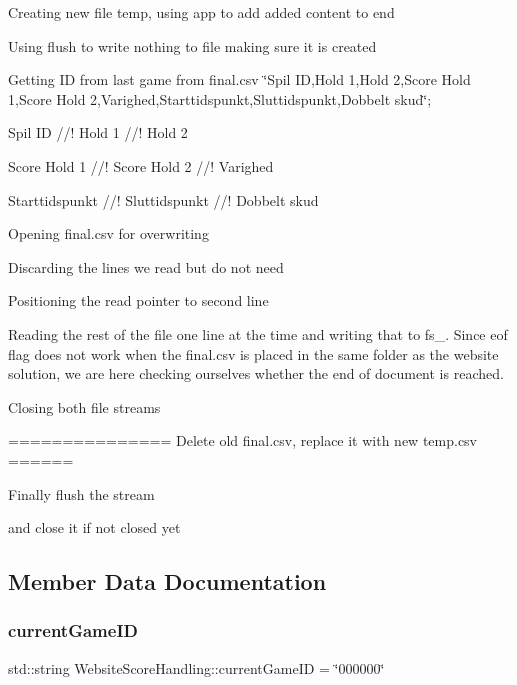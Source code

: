 Creating new file temp, using app to add added content to end

Using flush to write nothing to file making sure it is created

Getting ID from last game from final.\+csv \char`\"{}\+Spil I\+D,\+Hold 1,\+Hold 2,\+Score Hold 1,\+Score Hold 2,\+Varighed,\+Starttidspunkt,\+Sluttidspunkt,\+Dobbelt skud\char`\"{};

Spil ID //! Hold 1 //! Hold 2

Score Hold 1 //! Score Hold 2 //! Varighed

Starttidspunkt //! Sluttidspunkt //! Dobbelt skud

Opening final.\+csv for overwriting

Discarding the lines we read but do not need

Positioning the read pointer to second line

Reading the rest of the file one line at the time and writing that to fs\+\_\+. Since eof flag does not work when the final.\+csv is placed in the same folder as the website solution, we are here checking ourselves whether the end of document is reached.

Closing both file streams

=============== Delete old final.\+csv, replace it with new temp.\+csv ======

Finally flush the stream

and close it if not closed yet 

\subsection{Member Data Documentation}
\mbox{\label{class_website_score_handling_afd9be3d660d8e4b80431850583c9eaff}} 
\subsubsection{\texorpdfstring{current\+Game\+ID}{currentGameID}}
{\footnotesize\ttfamily std\+::string Website\+Score\+Handling\+::current\+Game\+ID = \char`\"{}000000\char`\"{}\hspace{0.3cm}{\ttfamily [private]}}

\mbox{\label{class_website_score_handling_a3cde6ae01393db61e049cee7eb0db7a9}} 
